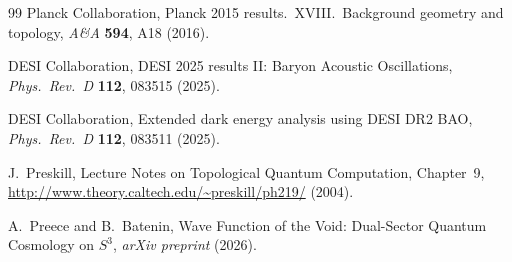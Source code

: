\documentclass[12pt,a4paper]{article}
\theoremstyle{definition}
\theoremstyle{remark}
\begin{document}
\begin{thebibliography}{99}
Planck Collaboration, Planck 2015 results.\ XVIII.\ Background geometry and topology,
\textit{A\&A} \textbf{594}, A18 (2016).

DESI Collaboration, DESI 2025 results II: Baryon Acoustic Oscillations,
\textit{Phys.\ Rev.\ D} \textbf{112}, 083515 (2025).

DESI Collaboration, Extended dark energy analysis using DESI DR2 BAO,
\textit{Phys.\ Rev.\ D} \textbf{112}, 083511 (2025).

J.~Preskill, Lecture Notes on Topological Quantum Computation, Chapter~9,
\url{http://www.theory.caltech.edu/~preskill/ph219/} (2004).

A.~Preece and B.~Batenin, Wave Function of the Void: Dual-Sector Quantum Cosmology
on $S^3$, \textit{arXiv preprint} (2026).

\end{thebibliography}
\end{document}
